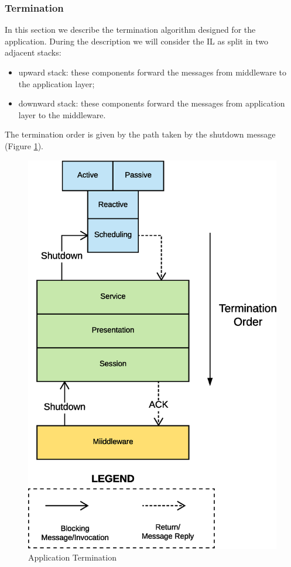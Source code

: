 \subsubsection{Termination}

In this section we describe the termination algorithm designed for the
application.
During the description we will consider the IL as
split in two adjacent stacks:

\begin{itemize}
  \item upward stack: these components forward the messages
  from middleware to the application layer;
  \item downward stack: these components forward the messages
  from application layer to the middleware.
\end{itemize}

The termination order is
given by the path taken by the shutdown message
(Figure \ref{fig:termination-app}).

\begin{figure}[H]
  \centering
  \includegraphics[scale=0.4,keepaspectratio]
    {images/solution/termination-app.eps}
  \caption{Application Termination}
  \label{fig:termination-app}
\end{figure}


